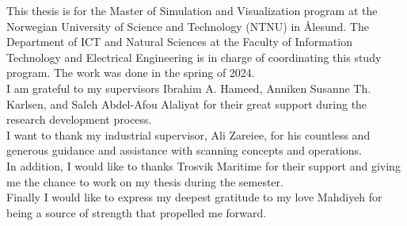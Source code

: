 


\noindent This thesis is for the Master of Simulation and Visualization program at the Norwegian University of Science and Technology (NTNU) in Ålesund. The Department of ICT and Natural Sciences at the Faculty of Information Technology and Electrical Engineering is in charge of coordinating this study program. The work was done in the spring of 2024.\\ I am grateful to my supervisors Ibrahim A. Hameed, Anniken Susanne Th. Karlsen, and Saleh Abdel-Afou Alaliyat for their great support during the research development process.\\
I want to thank my industrial supervisor, Ali Zareiee, for his countless and generous guidance and assistance with scanning concepts and operations.\\
In addition, I would like to thanks Trosvik Maritime for their support and giving me the chance to work on my thesis during the semester.\\Finally I would like to express my deepest gratitude to my love Mahdiyeh for being a source of strength that propelled me forward. 



